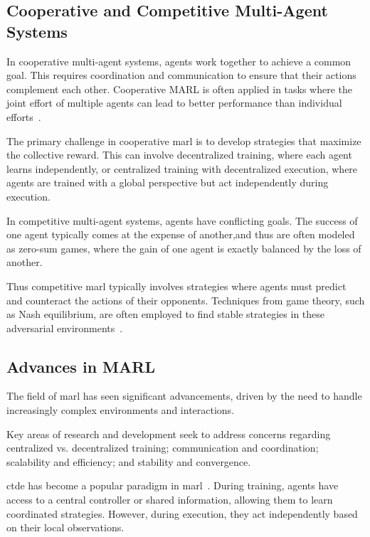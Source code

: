 \subsection*{Cooperative and Competitive Multi-Agent Systems}
In cooperative multi-agent systems, agents work together to achieve a common goal. 
This requires coordination and communication to ensure that their actions complement each other. 
Cooperative MARL is often applied in tasks where the joint effort of multiple agents can lead to 
better performance than individual efforts~\cite{littman1994}.

The primary challenge in cooperative \gls{marl} is to develop strategies that maximize the 
collective reward. This can involve decentralized training, where each agent learns independently, 
or centralized training with decentralized execution, where agents are trained with a global 
perspective but act independently during execution.

In competitive multi-agent systems, agents have conflicting goals. The success of one agent 
typically comes at the expense of another,and thus are often modeled as zero-sum games, 
where the gain of one agent is exactly balanced by the loss of another.

Thus competitive \gls{marl} typically involves strategies where agents must predict and 
counteract the actions of their opponents. Techniques from game theory, such as Nash equilibrium, 
are often employed to find stable strategies in these adversarial environments~\cite{busoniu2008}.

\subsection*{Advances in MARL}
The field of \gls{marl} has seen significant advancements, driven by the need to handle 
increasingly complex environments and interactions. 


Key areas of research and development seek to address concerns regarding
centralized vs. decentralized training;
communication and coordination;
scalability and efficiency; and
stability and convergence.

\Gls{ctde} has become a popular paradigm in \gls{marl}~\cite{rashid2018,foerster2017,lowe2020}. 
During training, agents have access to a central controller or shared information, 
allowing them to learn coordinated strategies. 
However, during execution, they act independently based on their local observations.

